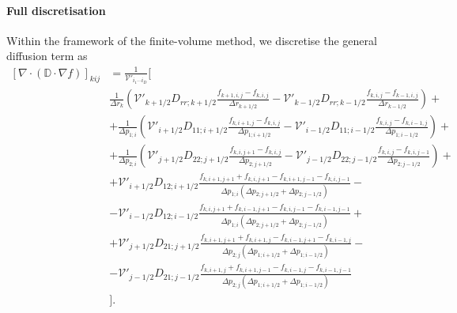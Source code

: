 \documentclass{notes}
\newcommand{\Vp}{\mathcal{V}'}
\begin{document}
    \paragraph{Full discretisation}
    Within the framework of the finite-volume method, we discretise the general
    diffusion term as
    \begin{equation}
        \begin{aligned}
            \left[ \nabla\cdot\left( \mathbb{D}\cdot\nabla f \right) \right]_{kij} &=
                \frac{1}{\Vp_{i_1\cdots i_D}}\Bigg[\\
                &\frac{1}{\Delta r_k}\left(
                    \Vp_{k+1/2}D_{rr;k+1/2}\frac{f_{k+1,i,j}-f_{k,i,j}}{\Delta r_{k+1/2}} -
                    \Vp_{k-1/2}D_{rr;k-1/2}\frac{f_{k,i,j}-f_{k-1,i,j}}{\Delta r_{k-1/2}}
                \right) +\\
                &+ \frac{1}{\Delta p_{1;i}} \left(
                    \Vp_{i+1/2}D_{11;i+1/2}\frac{f_{k,i+1,j} - f_{k,i,j}}{\Delta p_{1;i+1/2}} -
                    \Vp_{i-1/2}D_{11;i-1/2}\frac{f_{k,i,j} - f_{k,i-1,j}}{\Delta p_{1;i-1/2}}
                \right) +\\
                &+ \frac{1}{\Delta p_{2;i}} \left(
                    \Vp_{j+1/2}D_{22;j+1/2}\frac{f_{k,i,j+1} - f_{k,i,j}}{\Delta p_{2;j+1/2}} -
                    \Vp_{j-1/2}D_{22;j-1/2}\frac{f_{k,i,j} - f_{k,i,j-1}}{\Delta p_{2;j-1/2}}
                \right) +\\
                &+ \Vp_{i+1/2}D_{12;i+1/2}\frac{
                    f_{k,i+1,j+1} + f_{k,i,j+1} - f_{k,i+1,j-1} - f_{k,i,j-1}
                }{\Delta p_{1;i}\left(\Delta p_{2;j+1/2} + \Delta p_{2;j-1/2} \right)} -\\
                &- \Vp_{i-1/2}D_{12;i-1/2}\frac{
                    f_{k,i,j+1} + f_{k,i-1,j+1} - f_{k,i,j-1} - f_{k,i-1,j-1}
                }{\Delta p_{1;i}\left(\Delta p_{2;j+1/2} + \Delta p_{2;j-1/2} \right)} +\\
                &+ \Vp_{j+1/2}D_{21;j+1/2}\frac{
                    f_{k,i+1,j+1} + f_{k,i+1,j} - f_{k,i-1,j+1} - f_{k,i-1,j}
                }{\Delta p_{2;j}\left(\Delta p_{1;i+1/2} + \Delta p_{1;i-1/2} \right)} -\\
                &- \Vp_{j-1/2}D_{21;j-1/2}\frac{
                    f_{k,i+1,j} + f_{k,i+1,j-1} - f_{k,i-1,j} - f_{k,i-1,j-1}
                }{\Delta p_{2;j}\left(\Delta p_{1;i+1/2} + \Delta p_{1;i-1/2} \right)}\\
            &\Bigg].
        \end{aligned}
    \end{equation}
\end{document}
